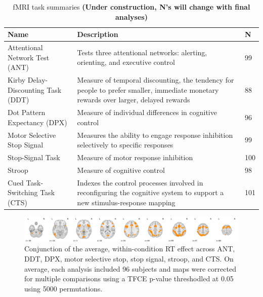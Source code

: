 \documentclass[titlepage,12pt] {article}
\begin{document}
\begin{table}[h!]
  \begin{center}
    \caption{fMRI task summaries \textbf{(Under construction, N's will change with final analyses)}}
    \label{tab:task_summaries}
    \begin{tabular}{|L{6cm}|L{7cm}|L{1cm}|}\hline
   \textbf{Name} & \textbf{Description} & \textbf{N} \\ \hline\hline
   Attentional Network Test (ANT) &  Tests three attentional networks: alerting, orienting, and executive control & 99 \\ \hline
   Kirby Delay-Discounting Task (DDT) & Measure of temporal discounting, the tendency for people to prefer smaller, immediate monetary rewards over larger, delayed rewards & 88 \\ \hline
   Dot Pattern Expectancy (DPX) & Measure of individual differences in cognitive control & 96 \\ \hline
   Motor Selective Stop Signal & Measures the ability to engage response inhibition selectively to specific responses & 99 \\ \hline
   Stop-Signal Task & Measure of motor response inhibition & 100 \\ \hline
   Stroop & Measure of cognitive control & 98 \\ \hline
   Cued Task-Switching Task (CTS) & Indexes the control processes involved in reconfiguring the cognitive system to support a new stimulus-response mapping & 101 \\ \hline
    \end{tabular}
   \end{center}
 \end{table}

\begin{figure}
  \centering
   \includegraphics[width=6.5in]{Figures/conjunction_avg_rt_effect_across_7tasks.pdf}
   \caption{Conjunction of the average, within-condition RT effect across ANT, DDT, DPX, motor selective stop, stop signal, stroop, and CTS.  On average, each analysis included 96 subjects and maps were corrected for multiple comparisons using a TFCE p-value threshodled at 0.05 using 5000 permutations.}
  \label{fig:conj}
\end{figure}
\end{document}

